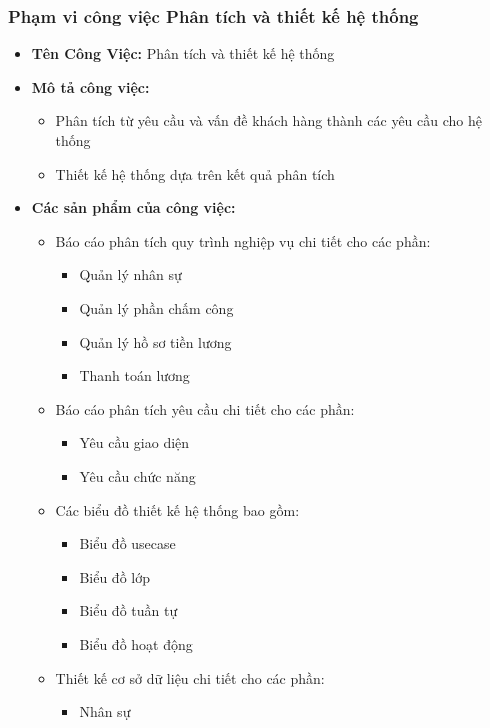 \subsubsection{Phạm vi công việc Phân tích và thiết kế hệ thống}
\begin{itemize}
    \item \textbf{Tên Công Việc:} Phân tích và thiết kế hệ thống
    \item \textbf{Mô tả công việc:}
    \begin{itemize}
        \item Phân tích từ yêu cầu và vấn đề khách hàng thành các yêu cầu cho hệ thống
        \item Thiết kế hệ thống dựa trên kết quả phân tích
    \end{itemize}
    \item \textbf{Các sản phẩm của công việc:}
    \begin{itemize}
        \item Báo cáo phân tích quy trình nghiệp vụ chi tiết cho các phần:
        \begin{itemize}
            \item Quản lý nhân sự
            \item Quản lý phần chấm công
            \item Quản lý hồ sơ tiền lương
            \item Thanh toán lương
        \end{itemize}
        \item Báo cáo phân tích yêu cầu chi tiết cho các phần:
        \begin{itemize}
            \item Yêu cầu giao diện
            \item Yêu cầu chức năng
        \end{itemize}
        \item Các biểu đồ thiết kế hệ thống bao gồm:
        \begin{itemize}
            \item Biểu đồ usecase
            \item Biểu đồ lớp
            \item Biểu đồ tuần tự
            \item Biểu đồ hoạt động
        \end{itemize}
        \item Thiết kế cơ sở dữ liệu chi tiết cho các phần:
        \begin{itemize}
            \item Nhân sự

\end{itemize}
\end{itemize}
\end{itemize}
